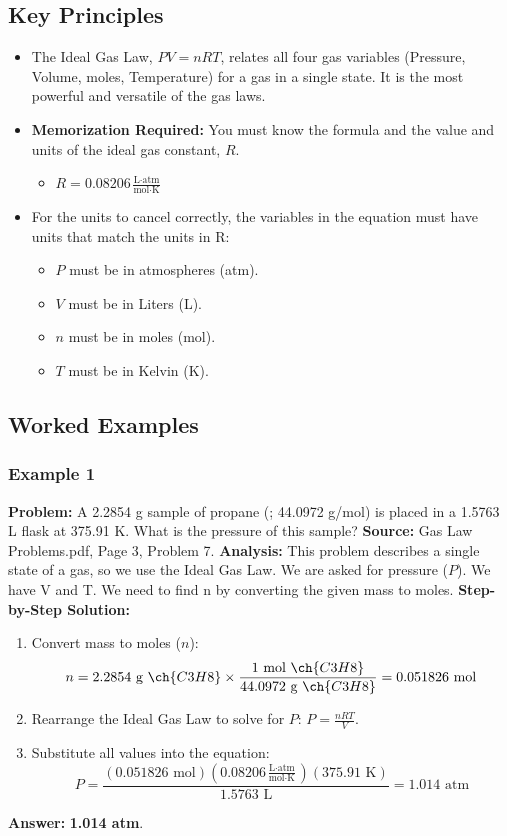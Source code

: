 \documentclass{article}
\begin{document}
\subsection{Key Principles}
\begin{itemize}
    \item The Ideal Gas Law, $PV=nRT$, relates all four gas variables (Pressure, Volume, moles, Temperature) for a gas in a single state. It is the most powerful and versatile of the gas laws.
    \item \textbf{Memorization Required:} You must know the formula and the value and units of the ideal gas constant, $R$.
        \begin{itemize}
            \item $R = 0.08206 \frac{\text{L}\cdot\text{atm}}{\text{mol}\cdot\text{K}}$
        \end{itemize}
    \item For the units to cancel correctly, the variables in the equation must have units that match the units in R:
        \begin{itemize}
            \item $P$ must be in atmospheres (atm).
            \item $V$ must be in Liters (L).
            \item $n$ must be in moles (mol).
            \item $T$ must be in Kelvin (K).
        \end{itemize}
\end{itemize}

\subsection{Worked Examples}
\subsubsection{Example 1}
\textbf{Problem:} A 2.2854 g sample of propane (; 44.0972 g/mol) is placed in a 1.5763 L flask at 375.91 K. What is the pressure of this sample?
\textbf{Source:} Gas Law Problems.pdf, Page 3, Problem 7.
\textbf{Analysis:} This problem describes a single state of a gas, so we use the Ideal Gas Law. We are asked for pressure ($P$). We have V and T. We need to find n by converting the given mass to moles.
\textbf{Step-by-Step Solution:}
\begin{enumerate}
    \item Convert mass to moles ($n$):
    \[ n = 2.2854 \text{ g } \ch{C3H8} \times \frac{1 \text{ mol } \ch{C3H8}}{44.0972 \text{ g } \ch{C3H8}} = 0.051826 \text{ mol} \]
    \item Rearrange the Ideal Gas Law to solve for $P$: $P = \frac{nRT}{V}$.
    \item Substitute all values into the equation:
    \[ P = \frac{(0.051826 \text{ mol})(0.08206 \frac{\text{L}\cdot\text{atm}}{\text{mol}\cdot\text{K}})(375.91 \text{ K})}{1.5763 \text{ L}} = 1.014 \text{ atm} \]
\end{enumerate}
\textbf{Answer:} \textbf{1.014 atm}.
\end{document}
